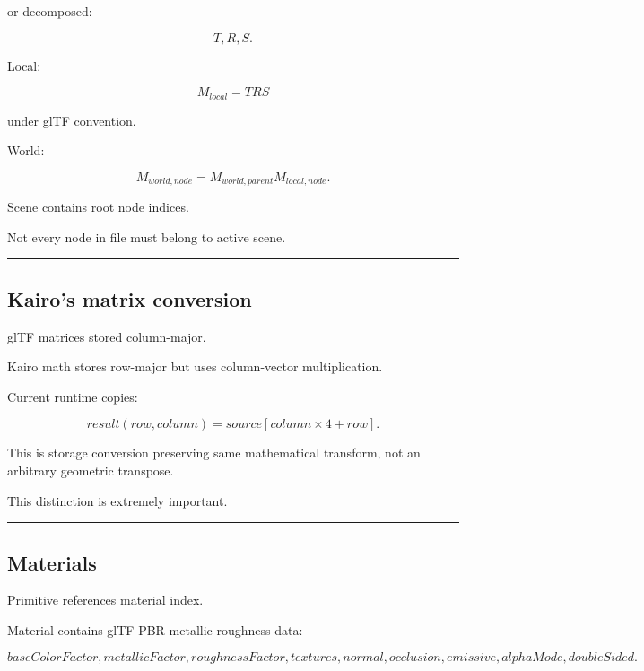 or decomposed:

\[
T,R,S.
\]

Local:

\[
M_{local}
=
T
R
S
\]

under glTF convention.

World:

\[
\boxed{
M_{world,node}
=
M_{world,parent}
M_{local,node}.
}
\]

Scene contains root node indices.

Not every node in file must belong to active scene.

\begin{center}\rule{0.5\linewidth}{0.5pt}\end{center}

\subsection{Kairo's matrix conversion}\label{04-visual-computing-ii-ch041-kairos-matrix-conversion}

\hypertarget{04-visual-computing-ii-ch041-kairos-matrix-conversion}{}

glTF matrices stored column-major.

Kairo math stores row-major but uses column-vector multiplication.

Current runtime copies:

\[
result(row,column)
=
source[column\times4+row].
\]

This is storage conversion preserving same mathematical transform, not an arbitrary geometric transpose.

This distinction is extremely important.

\begin{center}\rule{0.5\linewidth}{0.5pt}\end{center}

\subsection{Materials}\label{04-visual-computing-ii-ch041-materials}

\hypertarget{04-visual-computing-ii-ch041-materials}{}

Primitive references material index.

Material contains glTF PBR metallic-roughness data:

\[
baseColorFactor,
metallicFactor,
roughnessFactor,
textures,
normal,
occlusion,
emissive,
alphaMode,
doubleSided.
\]

